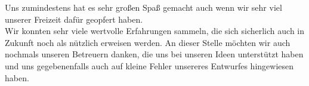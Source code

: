 \documentclass{scrartcl}
\begin{document}
	Uns zumindestens hat es sehr großen Spaß gemacht auch wenn wir sehr viel unserer Freizeit dafür geopfert haben. \\
	Wir konnten sehr viele wertvolle Erfahrungen sammeln, die sich sicherlich auch in Zukunft noch als nützlich erweisen werden. 	
	An dieser Stelle möchten wir auch nochmals unseren Betreuern danken, die uns bei unseren Ideen unterstützt haben und uns gegebenenfalls auch auf kleine Fehler unsereres Entwurfes hingewiesen haben. \\
     
\end{document}
